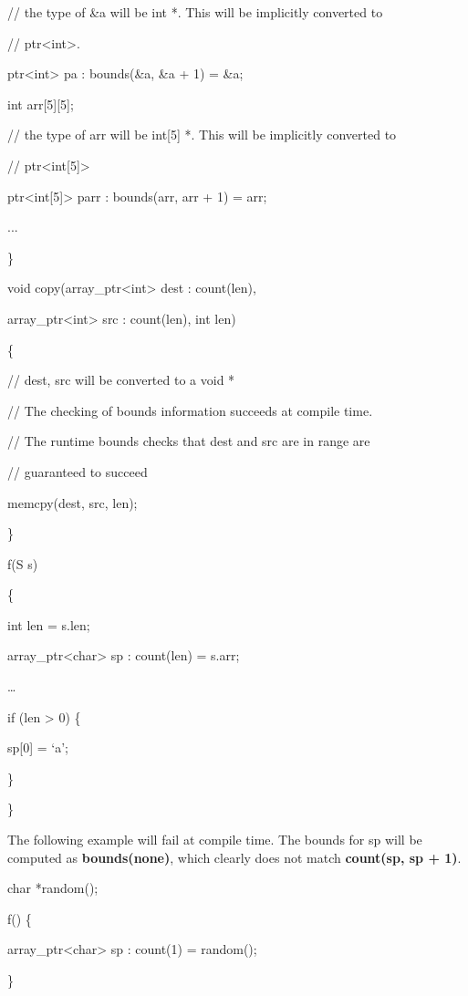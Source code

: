 // the type of \&a will be int *. This will be implicitly converted to

// ptr\textless{}int\textgreater{}.

ptr\textless{}int\textgreater{} pa : bounds(\&a, \&a + 1) = \&a;

int arr{[}5{]}{[}5{]};

// the type of arr will be int{[}5{]} *. This will be implicitly
converted to

// ptr\textless{}int{[}5{]}\textgreater{}

ptr\textless{}int{[}5{]}\textgreater{} parr : bounds(arr, arr + 1) =
arr;

...

\}

void copy(array\_ptr\textless{}int\textgreater{} dest : count(len),

array\_ptr\textless{}int\textgreater{} src : count(len), int len)

\{

// dest, src will be converted to a void *

// The checking of bounds information succeeds at compile time.

// The runtime bounds checks that dest and src are in range are

// guaranteed to succeed

memcpy(dest, src, len);

\}

f(S s)

\{

int len = s.len;

array\_ptr\textless{}char\textgreater{} sp : count(len) = s.arr;

\ldots{}

if (len \textgreater{} 0) \{

sp{[}0{]} = `a';

\}

\}

The following example will fail at compile time. The bounds for sp will
be computed as \textbf{bounds(none)}, which clearly does not match
\textbf{count(sp, sp + 1)}.

char *random();

f() \{

array\_ptr\textless{}char\textgreater{} sp : count(1) = random();

\}
 
 